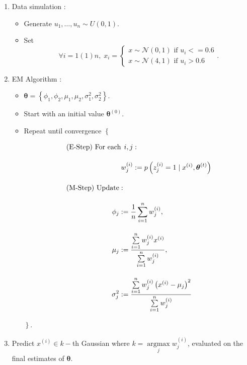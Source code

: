 \documentclass[11pt, a4paper]{article}\usepackage[]{graphicx}\usepackage[]{xcolor}
\newcommand{\bs}[1]{\boldsymbol{#1}}
\begin{document}
\begin{enumerate}

\item[\scalebox{2.0}{\twemoji{keycap: 1}}] \hspace{0.2cm} Data simulation :

\begin{itemize}
\item Generate $u_1, \ldots, u_n \sim U(0, 1)$.

\item Set $$\forall i = 1(1)n, \; x_i = \begin{cases} x \sim \mathcal{N}\!\left(0, 1\right) \text{ if } u_i <= 0.6 \\[0.5em] x \sim \mathcal{N}\!\left(4, 1\right)\text{ if } u_i > 0.6 \end{cases}.$$
\end{itemize}

\newpage

\item[\scalebox{2.0}{\twemoji{keycap: 2}}] \hspace{0.2cm} EM Algorithm :

\begin{itemize}
\item $\bs{\theta} = \left\{ \phi_1, \phi_2, \mu_1, \mu_2, \sigma_1^2, \sigma_2^2\right\}$.

\item Start with an initial value $\bs{\theta}^{(0)}$.

\item Repeat until convergence $\left\{ \right.$

\begin{align*}
&\text{(E-Step) For each} 
\begin{aligned}[t]
i, j &: \\[1em]
w_{j}^{(i)} &:= p \left( z_{j}^{(i)} = 1 \mid {x}^{(i)}, \bs{\theta}^{(t)} \right)
\end{aligned}\\[1em]
&\text{(M-Step) } 
\begin{aligned}[t]
\text{Update} &: \\[1em]
\hspace{-2em}\phi_j &:= \dfrac{1}{n} \sum \limits_{i=1}^{n}w_j^{(i)}, \\[1em]
{\mu}_j &:= \dfrac{\sum \limits_{i = 1}^{n} w_j^{(i)} {x}^{(i)}}{\sum \limits_{i = 1}^{n} w_j^{(i)}}, \\[1em]
{\sigma}_j^2 &:= \dfrac{\sum \limits_{i=1}^{n} w_j^{(i)} \left({x}^{(i)}-{\mu}_{j}\right)^2}{\sum \limits_{i=1}^{n} w_j^{(i)}}
\end{aligned}
\end{align*}

$\left. \right\}$.
\end{itemize}

\item[\scalebox{2.0}{\twemoji{keycap: 3}}] \hspace{0.2cm} Predict $x^{(i)} \in k-$th Gaussian where $k = \operatorname*{argmax}\limits_{j} w_{j}^{(i)}$, evaluated on the final estimates of $\bs{\theta}$.
\end{enumerate}
\end{document}

